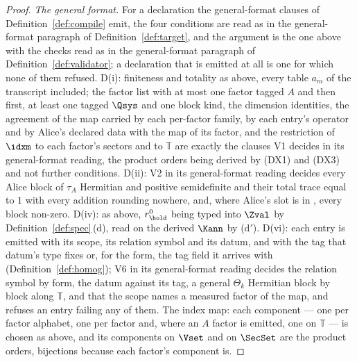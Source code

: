 \begin{proof}
\emph{The general format.} For a declaration the general-format clauses of
Definition~\ref{def:compile} emit, the four conditions are read as in the
general-format paragraph of Definition~\ref{def:target}, and the argument is
the one above with the checks read as in the general-format paragraph of
Definition~\ref{def:validator}; a declaration that is emitted at all is one
for which none of them refused. D(i): finiteness and totality as above, every
table $a_m$ of the transcript included; the factor list with at most one factor
tagged $A$ and then first, at least one tagged $\Qsys$ and one block kind, the
dimension identities, the agreement of the map carried by each per-factor
family, by each entry's operator and by Alice's declared data with the map of
its factor, and the restriction of $\idxm$ to each factor's sectors and to
$\mathbb{T}$ are exactly the clauses V1 decides in its general-format
reading, the product orders being derived by (DX1) and (DX3) and not further
conditions. D(ii): V2 in its general-format reading decides every Alice block
of $\tau_A$ Hermitian and positive semidefinite and their total trace equal to
$1$ with every addition rounding nowhere, and, where Alice's slot is in
, every block non-zero. D(iv): as above, $r^{0}_{\hold}$
being typed into $\Zval$ by Definition~\ref{def:spec}\,(d), read on the
derived $\Kann$ by (d$'$). D(vi): each entry is emitted with its scope, its
relation symbol and its datum, and with the tag that datum's type fixes or,
for the  form, the tag field it arrives with
(Definition~\ref{def:homog}); V6 in its general-format reading decides the
relation symbol by form, the datum against its tag, a general $\Theta_k$
Hermitian block by block along $\mathbb{T}$, and that the scope names a
measured factor of the map, and refuses an entry failing any of them. The
index map: each component --- one per factor alphabet, one per factor
 and, where an $A$ factor is emitted, one on $\mathbb{T}$ ---
is chosen as above, and its components on $\Vset$ and on $\SecSet$ are the
product orders, bijections because each factor's component is.
\end{proof}
